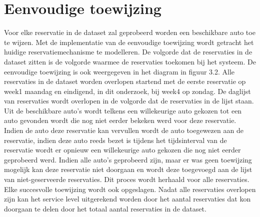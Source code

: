 \section{Eenvoudige toewijzing} \label{eenvoudige-toewijzing}
Voor elke reservatie in de dataset zal geprobeerd worden een beschikbare auto toe te wijzen. Met de implementatie van de eenvoudige toewijzing wordt getracht het huidige reservatiemechanisme te modelleren. De volgorde dat de reservaties in de dataset zitten is de volgorde waarmee de reservaties toekomen bij het systeem. De eenvoudige toewijzing is ook weergegeven in het diagram in figuur 3.2. Alle reservaties in de dataset worden overlopen startend met de eerste reservatie op week1 maandag en eindigend, in dit onderzoek, bij week4 op zondag. De daglijst van reservaties wordt overlopen in de volgorde dat de reservaties in de lijst staan. Uit de beschikbare auto's wordt telkens een willekeurige auto gekozen tot een auto gevonden wordt die nog niet eerder bekeken werd voor deze reservatie. Indien de auto deze reservatie kan vervullen wordt de auto toegewezen aan de reservatie, indien deze auto reeds bezet is tijdens het tijdsinterval van de reservatie wordt er opnieuw een willekeurige auto gekozen die nog niet eerder geprobeerd werd. Indien alle auto's geprobeerd zijn, maar er was geen toewijzing mogelijk kan deze reservatie niet doorgaan en wordt deze toegevoegd aan de lijst van niet-geserveerde reservaties. Dit proces wordt herhaald voor alle reservaties. Elke succesvolle toewijzing wordt ook opgeslagen. Nadat alle reservaties overlopen zijn kan het service level uitgerekend worden door het aantal reservaties dat kon doorgaan te delen door het totaal aantal reservaties in de dataset. 
